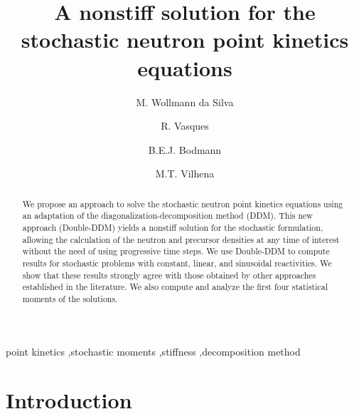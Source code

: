 \documentclass[preprint,12pt,authoryear]{elsarticle}
\begin{document}
\begin{frontmatter}

\title{A nonstiff solution for the stochastic neutron point kinetics equations}

\author[ufrgs]{M. Wollmann da Silva}
\author[ucb]{R. Vasques}
\author[ufrgs]{B.E.J. Bodmann}
\author[ufrgs]{M.T. Vilhena}

\address[ufrgs]{UFRGS - Federal University of Rio Grande do Sul, Av. Osvaldo
Aranha 99, 90046-900\\ Porto Alegre, RS, Brazil}
\address[ucb]{University of California, Berkeley, Department of Nuclear Engineering, 4155 Etcheverry Hall \\ Berkeley, CA 94720-1730}


\begin{abstract}

We propose an approach to solve the stochastic neutron point kinetics equations using an adaptation of the diagonalization-decomposition method (DDM).
This new approach (Double-DDM) yields a nonstiff solution for the stochastic formulation, allowing the calculation of the neutron and precursor densities at any time of interest without the need of using progressive time steps.
We use Double-DDM to compute results for stochastic problems with constant, linear, and sinusoidal reactivities.
We show that these results strongly agree with those obtained by other approaches established in the literature.
We also compute and analyze the first four statistical moments of the solutions.

\end{abstract}

\begin{keyword}
point kinetics \sep stochastic moments \sep stiffness \sep decomposition method
\end{keyword}

\end{frontmatter}

\section{Introduction}\label{sec1}
\setcounter{section}{1}
\setcounter{equation}{0} 
\end{document}
